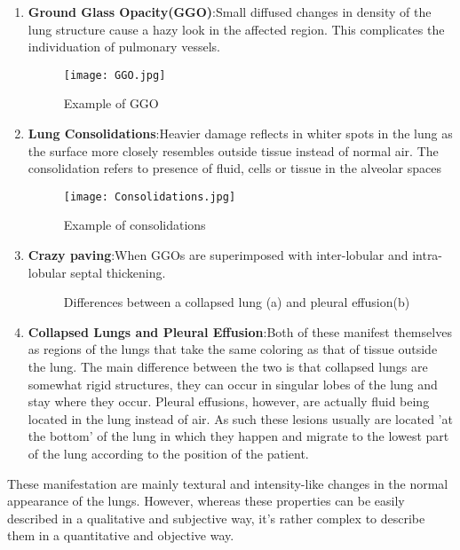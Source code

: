 \begin{enumerate}\label{Clinical_Covid_Manifestations}
        \item \textbf{Ground Glass Opacity(GGO)}:\newline Small diffused changes in density of the lung structure cause a hazy look in the affected region. This complicates the individuation of pulmonary vessels.
			\begin{figure}[htbp]
				\centering
				\texttt{[image: GGO.jpg]}
				\caption{Example of GGO\label{GGOImage}}
			\end{figure}
        \item \textbf{Lung Consolidations}:\newline Heavier damage reflects in whiter spots in the lung as the surface more closely resembles outside tissue instead of normal air. The consolidation refers to presence of fluid, cells or tissue in the alveolar spaces
			\begin{figure}[htbp]
				\centering
				\texttt{[image: Consolidations.jpg]}
				\caption{Example of consolidations\label{Consolidation}}
			\end{figure}
        \item \textbf{Crazy paving}:\newline When GGOs are superimposed with inter-lobular and intra-lobular septal thickening.
			\begin{figure}[htbp]
				\centering
				\caption{Differences between a collapsed lung (a) and pleural effusion(b)}
			\end{figure}
	\item \textbf{Collapsed Lungs and Pleural Effusion}:\newline Both of these manifest themselves as regions of the lungs that take the same coloring as that of tissue outside the lung. The main difference between the two is that collapsed lungs are somewhat rigid structures, they can occur in singular lobes of the lung and stay where they occur. Pleural effusions, however, are actually fluid being located in the lung instead of air. As such these lesions usually are located 'at the bottom' of the lung in which they happen and migrate to the lowest part of the lung according to the position of the patient.
\end{enumerate}

These manifestation are mainly textural and intensity-like changes in the normal appearance of the lungs.
However, whereas these properties can be easily described in a qualitative and subjective way, it's rather complex to describe them in a quantitative and objective way.

